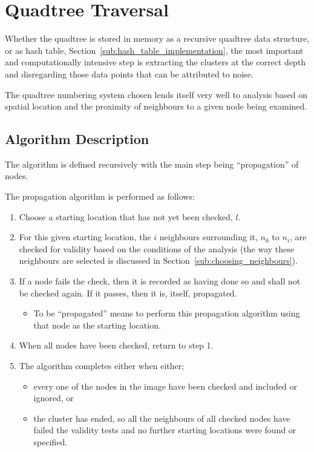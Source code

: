 
\section{Quadtree Traversal}
\label{sec:quadtree_traversal}

Whether the quadtree is stored in memory as a recursive quadtree data
structure, or as hash table, Section~\ref{sub:hash_table_implementation}, the
most important and computationally intensive step is extracting the clusters at
the correct depth and disregarding those data points that can be attributed to
noise.

The quadtree numbering system chosen lends itself very well to analysis based
on spatial location and the proximity of neighbours to a given node being
examined.

\subsection{Algorithm Description}
\label{sub:algorithm_description}

The algorithm is defined recursively with the main step being ``propagation''
of nodes.

The propagation algorithm is performed as follows:
\begin{enumerate}
	\item Choose a starting location that has not yet been checked, $l$.
	\item For this given starting location, the $i$ neighbours surrounding it,
		$n_0$ to $n_i$, are checked for validity based on the conditions of the
		analysis (the way these neighbours are selected is discussed in
		Section~\ref{sub:choosing_neighbours}).
	\item If a node fails the check, then it is recorded as having done so and
		shall not be checked again. If it passes, then it is, itself,
		propagated.
		\begin{itemize}
			\item To be ``propagated'' means to perform this propagation
				algorithm using that node as the starting location.
		\end{itemize}
	\item When all nodes have been checked, return to step 1.
	\item The algorithm completes either when either;
	\begin{itemize}
		\item every one of the nodes in the image have been checked and
			included or ignored, or
		\item the cluster has ended, so all the neighbours of all checked nodes
			have failed the validity tests and no further starting locations
			were found or specified.
	\end{itemize}
\end{enumerate}

